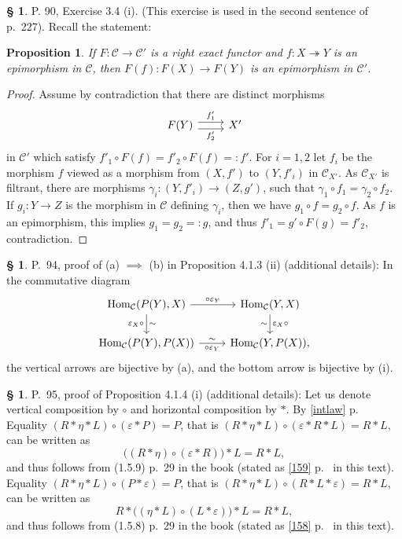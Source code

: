 \documentclass[12pt]{article}
\newtheorem{prop}[thm]{Proposition}
\theoremstyle{remark}
\theoremstyle{definition}
\newtheorem{s}[thm]{\S}
\newcommand{\C}{\mathcal C}
\newcommand{\epi}{\twoheadrightarrow}
\DeclareMathOperator{\Hom}{Hom}%
\begin{document}
\begin{s} 
P. 90, Exercise 3.4 (i). (This exercise is used in the second sentence of p.~227). Recall the statement: 
%
\begin{prop}\label{34i}
If $F:\C\to\C'$ is a right exact functor and $f:X\epi Y$ is an epimorphism in $\C$, then $F(f):F(X)\to F(Y)$ is an epimorphism in $\C'$.
\end{prop}
%
\begin{proof}
Assume by contradiction that there are distinct morphisms 
$$
\begin{tikzcd}F(Y)\ar[yshift=.7ex]{r}{f'_1}\ar[yshift=-.7ex]{r}[swap]{f'_2}&X'\end{tikzcd}
$$ 
in $\C'$ which satisfy 
$
f'_1\circ F(f)=f'_2\circ F(f)=:f'.
$ 
For $i=1,2$ let $f_i$ be the morphism $f$ viewed as a morphism from $(X,f')$ to $(Y,f'_i)$ in $\C_{X'}$. As $\C_{X'}$ is filtrant, there are morphisms $\gamma_i:(Y,f'_i)\to(Z,g')$, such that $\gamma_1\circ f_1=\gamma_2\circ f_2$. If $g_i:Y\to Z$ is the morphism in $\C$ defining $\gamma_i$, then we have $g_1\circ f=g_2\circ f$. As $f$ is an epimorphism, this implies $g_1=g_2=:g$, and thus $f'_1=g'\circ F(g)=f'_2$, contradiction.
\end{proof}
\end{s}
%
%
\begin{s} 
P.~94, proof of (a) $\implies$ (b) in Proposition 4.1.3 (ii) (additional details): In the commutative diagram 
$$
\begin{tikzcd}
\Hom_\C(P(Y),X)\ar{d}{\sim}[swap]{\varepsilon_X\circ}\ar{r}{\circ\varepsilon_Y}&\Hom_\C(Y,X)\ar{d}{\varepsilon_X\circ}[swap]{\sim}\\ 
\Hom_\C(P(Y),P(X))\ar{r}[swap]{\circ\varepsilon_Y}{\sim}&\Hom_\C(Y,P(X)),
\end{tikzcd}
$$ 
the vertical arrows are bijective by (a), and the bottom arrow is bijective by (i).
\end{s}
%
%
\begin{s} 
P.~95, proof of Proposition 4.1.4 (i) (additional details): Let us denote vertical composition by $\circ$ and horizontal composition by $*$. By \eqref{intlaw} p.~\pageref{intlaw} Equality $(R*\eta*L)\circ(\varepsilon*P)=P$, that is $(R*\eta*L)\circ(\varepsilon*R*L)=R*L$, can be written as 
$$
\Big((R*\eta)\circ(\varepsilon*R)\Big)*L=R*L,
$$ 
and thus follows from (1.5.9) p.~29 in the book (stated as \eqref{159} p.~\pageref{159} in this text). Equality $(R*\eta*L)\circ(P*\varepsilon)=P$, that is $(R*\eta*L)\circ(R*L*\varepsilon)=R*L$, can be written as 
$$
R*\Big((\eta*L)\circ(L*\varepsilon)\Big)*L=R*L,
$$ 
and thus follows from (1.5.8) p.~29 in the book (stated as \eqref{158} p.~\pageref{158} in this text).
\end{s}
\end{document}
